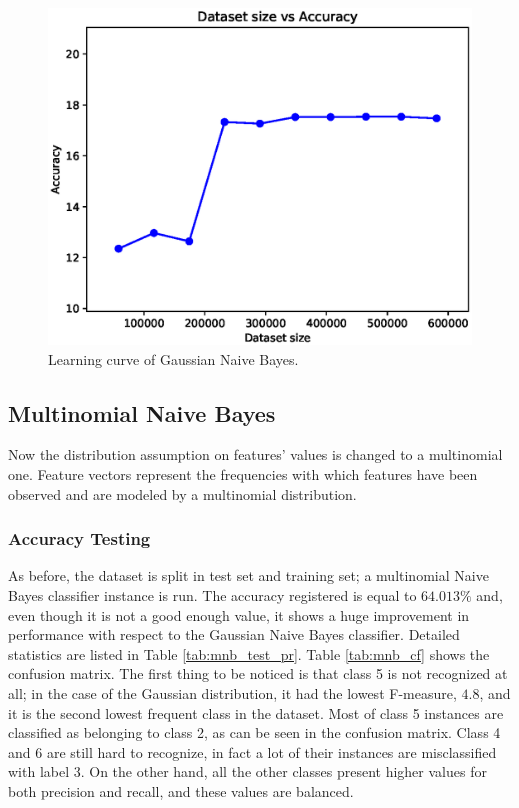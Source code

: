 \documentclass[a4paper, 10pt]{article}
\begin{document}
\begin{figure}[h!]
 \centering
 \includegraphics[width=0.8\linewidth]{pictures/nb_gaussian_size_vs_accuracy.eps}
 \caption{Learning curve of Gaussian Naive Bayes.}
 \label{fig:gnb_learning}
\end{figure}

    
\subsection{Multinomial Naive Bayes}

Now the distribution assumption on features' values is changed to a multinomial one. Feature vectors represent the frequencies with which features have been observed and are modeled by a multinomial distribution.

\subsubsection{Accuracy Testing}
As before, the dataset is split in test set and training set; a multinomial Naive Bayes classifier instance is run. The accuracy registered is equal to $64.013\%$ and, even though it is not a good enough value, it shows a huge improvement in performance with respect to the Gaussian Naive Bayes classifier. Detailed statistics are listed in Table \ref{tab:mnb_test_pr}. Table \ref{tab:mnb_cf} shows the confusion matrix. The first thing to be noticed is that class 5 is not recognized at all; in the case of the Gaussian distribution, it had the lowest F-measure, $4.8$, and it is the second lowest frequent class in the dataset. Most of class 5 instances are classified as belonging to class 2, as can be seen in the confusion matrix. Class 4 and 6 are still hard to recognize, in fact a lot of their instances are misclassified with label 3. On the other hand, all the other classes present higher values for both precision and recall, and these values are balanced.
\end{document}
